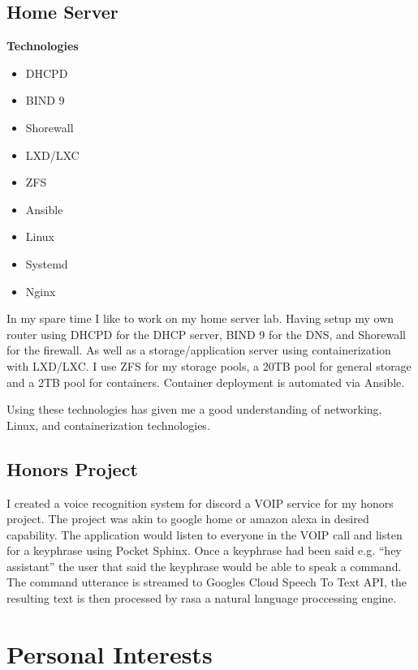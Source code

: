 \documentclass[a4paper]{cv}
\begin{document}
\begin{minipage}[t]{0.66\textwidth}
\subsection{Home Server}
\begin{multicols}{4}
{\bfseries Technologies}\vfill\null
\columnbreak
\begin{itemize} 
    \item DHCPD
    \item BIND 9
    \item Shorewall
    \item LXD/LXC
    \item ZFS
    \item Ansible
    \item Linux
    \item Systemd
    \item Nginx
\end{itemize}
\end{multicols}
In my spare time I like to work on my home server lab. Having setup my own router using DHCPD for the DHCP server, BIND 9 for the DNS, and Shorewall for the firewall. As well as a storage/application server using containerization with LXD/LXC. I use ZFS for my storage pools, a 20TB pool for general storage and a 2TB pool for containers. Container deployment is automated via Ansible.

Using these technologies has given me a good understanding of networking, Linux, and containerization technologies.

\subsection{Honors Project}
I created a voice recognition system for discord a VOIP service for my honors project. The project was akin to google home or amazon alexa in desired capability. The application would listen to everyone in the VOIP call and listen for a keyphrase using Pocket Sphinx. Once a keyphrase had been said e.g. ``hey assistant'' the user that said the keyphrase would be able to speak a command. The command utterance is streamed to Googles Cloud Speech To Text API, the resulting text is then processed by rasa a natural language proccessing engine.
\section{Personal Interests}
\end{minipage}
\end{document}
